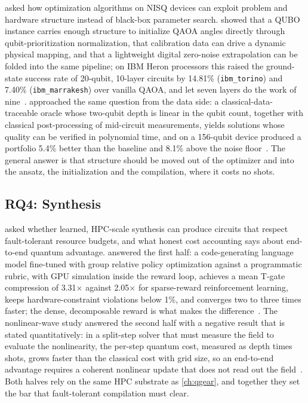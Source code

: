  asked how optimization algorithms on NISQ devices can exploit problem and hardware structure instead of black-box parameter search. \deal{} showed that a QUBO instance carries enough structure to initialize QAOA angles directly through qubit-prioritization normalization, that calibration data can drive a dynamic physical mapping, and that a lightweight digital zero-noise extrapolation can be folded into the same pipeline; on IBM Heron processors this raised the ground-state success rate of 20-qubit, 10-layer circuits by 14.81\% (\texttt{ibm\_torino}) and 7.40\% (\texttt{ibm\_marrakesh}) over vanilla QAOA, and let seven layers do the work of nine~\cite{guo2025deal}. \qawa{} approached the same question from the data side: a classical-data-traceable oracle whose two-qubit depth is linear in the qubit count, together with classical post-processing of mid-circuit measurements, yields solutions whose quality can be verified in polynomial time, and on a 156-qubit device produced a portfolio 5.4\% better than the baseline and 8.1\% above the noise floor~\cite{guo2025qawa}. The general answer is that structure should be moved out of the optimizer and into the ansatz, the initialization and the compilation, where it costs no shots.

\subsection{RQ4: Synthesis}\label{sec:conclusion:rq4}

 asked whether learned, HPC-scale synthesis can produce circuits that respect fault-tolerant resource budgets, and what honest cost accounting says about end-to-end quantum advantage. \rubriq{} answered the first half: a code-generating language model fine-tuned with group relative policy optimization against a programmatic rubric, with GPU simulation inside the reward loop, achieves a mean T-gate compression of 3.31$\times$ against 2.05$\times$ for sparse-reward reinforcement learning, keeps hardware-constraint violations below 1\%, and converges two to three times faster; the dense, decomposable reward is what makes the difference~\cite{guo2026rubriq}. The nonlinear-wave study answered the second half with a negative result that is stated quantitatively: in a split-step solver that must measure the field to evaluate the nonlinearity, the per-step quantum cost, measured as depth times shots, grows faster than the classical cost with grid size, so an end-to-end advantage requires a coherent nonlinear update that does not read out the field~\cite{guo2026nonlinearwaves}. Both halves rely on the same HPC substrate as \cref{ch:qgear}, and together they set the bar that fault-tolerant compilation must clear.

